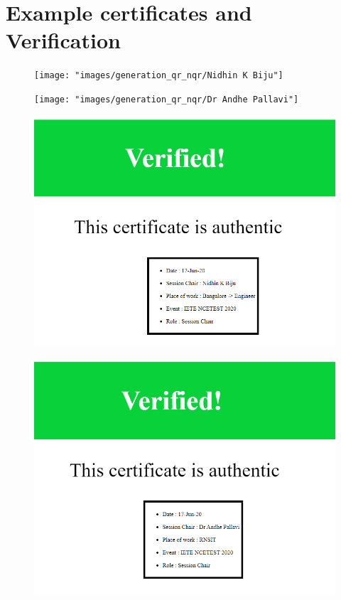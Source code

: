 \chapter{Example certificates and Verification}

\begin{figure}[H]
	\centering
	\texttt{[image: "images/generation\_qr\_nqr/Nidhin K Biju"]}
	\label{fig:nidhin-k-biju}
\end{figure}
\begin{figure}[H]
	\centering
	\texttt{[image: "images/generation\_qr\_nqr/Dr Andhe Pallavi"]}
	\label{fig:dr-andhe-pallavi}
\end{figure}


\begin{figure}[H]
	\centering
	\includegraphics[width=0.7\linewidth]{"images/generation_qr_nqr/Screenshot (64)"}
	\label{fig:screenshot-64}
\end{figure}
\begin{figure}[H]
	\centering
	\includegraphics[width=0.7\linewidth]{"images/generation_qr_nqr/Screenshot (63)"}
	\label{fig:screenshot-63}
\end{figure}
